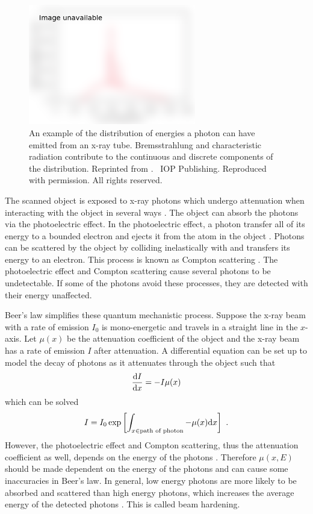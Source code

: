 \begin{figure}
  \centering
  \includegraphics[width=0.65\textwidth]{../figures/literatureReview/literature_spectrum.png}
  \caption{An example of the distribution of energies a photon can have emitted from an x-ray tube. Bremsstrahlung and characteristic radiation contribute to the continuous and discrete components of the distribution. Reprinted from \cite{michael2001x}. \textcopyright\ IOP Publishing. Reproduced with permission. All rights reserved.}
  \label{fig:literature_spectrum}
\end{figure}

The scanned object is exposed to x-ray photons which undergo attenuation when interacting with the object in several ways \citep{cantatore2011introduction}. The object can absorb the photons via the photoelectric effect. In the photoelectric effect, a photon transfer all of its energy to a bounded electron and ejects it from the atom in the object \citep{millikan1916direct}. Photons can be scattered by the object by colliding inelastically with and transfers its energy to an electron. This process is known as Compton scattering \citep{compton1923quantum}. The photoelectric effect and Compton scattering cause several photons to be undetectable. If some of the photons avoid these processes, they are detected with their energy unaffected.

Beer's law simplifies these quantum mechanistic process. Suppose the x-ray beam with a rate of emission $I_0$ is mono-energetic and travels in a straight line in the $x$-axis. Let $\mu(x)$ be the attenuation coefficient of the object and the x-ray beam has a rate of emission $I$ after attenuation. A differential equation can be set up to model the decay of photons as it attenuates through the object such that
\begin{equation}
\dfrac{\mathrm{d} I}{\mathrm{d} x} = -I\mu(x)
\end{equation}
which can be solved
\begin{equation}
I = I_0\exp\left[\int_{x \in \text{path of photon}}-\mu(x)\mathrm{d} x\right] \ .
\label{eq:beerLaw}
\end{equation}
However, the photoelectric effect and Compton scattering, thus the attenuation coefficient as well, depends on the energy of the photons \citep{elbakri2002statistical}. Therefore $\mu(x,E)$ should be made dependent on the energy of the photons \citep{cantatore2011introduction} and can cause some inaccuracies in Beer's law. In general, low energy photons are more likely to be absorbed and scattered than high energy photons, which increases the average energy of the detected photons \citep{sun2012overview}. This is called beam hardening.

